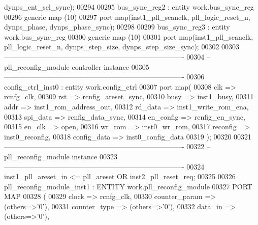 \begin{DoxyCode}
      dynps_cnt_sel_sync\textcolor{vhdlchar}{)};
00294  
00295  bus\_sync\_reg2 : \textcolor{keywordflow}{entity} work.bus_sync_reg
00296  \textcolor{keywordflow}{generic} \textcolor{keywordflow}{map} (\textcolor{vhdllogic}{10}\textcolor{vhdlchar}{)} 
00297  \textcolor{keywordflow}{port} \textcolor{keywordflow}{map}(inst1_pll_scanclk, pll_logic_reset_n, dynps_phase, dynps_phase_sync\textcolor{vhdlchar}{)};
00298  
00299   bus\_sync\_reg3 : \textcolor{keywordflow}{entity} work.bus_sync_reg
00300  \textcolor{keywordflow}{generic} \textcolor{keywordflow}{map} (\textcolor{vhdllogic}{10}\textcolor{vhdlchar}{)} 
00301  \textcolor{keywordflow}{port} \textcolor{keywordflow}{map}(inst1_pll_scanclk, pll_logic_reset_n, dynps_step_size, 
      dynps_step_size_sync\textcolor{vhdlchar}{)};
00302  
00303 \textcolor{keyword}{----------------------------------------------------------------------------}
00304 \textcolor{keyword}{-- pll\_reconfig\_module controller instance}
00305 \textcolor{keyword}{----------------------------------------------------------------------------}
00306 config\_ctrl\_inst0 : \textcolor{keywordflow}{entity} work.config_ctrl
00307 \textcolor{keywordflow}{port} \textcolor{keywordflow}{map}(
00308       clk         => rcnfg_clk,
00309       rst         => rcnfig_areset_sync,
00310       busy        => inst1_busy,
00311       addr        => inst1_rom_address_out,
00312       rd_data     => inst1_write_rom_ena,
00313       spi_data    => rcnfig_data_sync,
00314       en_config   => rcnfig_en_sync,
00315       en_clk      => \textcolor{keywordflow}{open},
00316       wr_rom      => inst0_wr_rom,
00317       reconfig    => inst0_reconfig,
00318       config_data => inst0_config_data
00319 \textcolor{vhdlchar}{)};
00320  
00321 \textcolor{keyword}{----------------------------------------------------------------------------}
00322 \textcolor{keyword}{-- pll\_reconfig\_module instance}
00323 \textcolor{keyword}{---------------------------------------------------------------------------- }
00324 inst1\_pll\_areset\_in <= pll\_areset \textcolor{keywordflow}{OR} inst2\_pll\_reset\_req;
00325 
00326 pll\_reconfig\_module\_inst1 : \textcolor{keywordflow}{ENTITY} work.pll_reconfig_module
00327    \textcolor{keywordflow}{PORT} \textcolor{keywordflow}{MAP}
00328 (
00329       clock                => rcnfg_clk,
00330       counter_param        => \textcolor{vhdlchar}{(}\textcolor{keywordflow}{others}=>'0'\textcolor{vhdlchar}{)},
00331       counter_type         => \textcolor{vhdlchar}{(}\textcolor{keywordflow}{others}=>'0'\textcolor{vhdlchar}{)},
00332       data_in              => \textcolor{vhdlchar}{(}\textcolor{keywordflow}{others}=>'0'\textcolor{vhdlchar}{)},

\end{DoxyCode}
